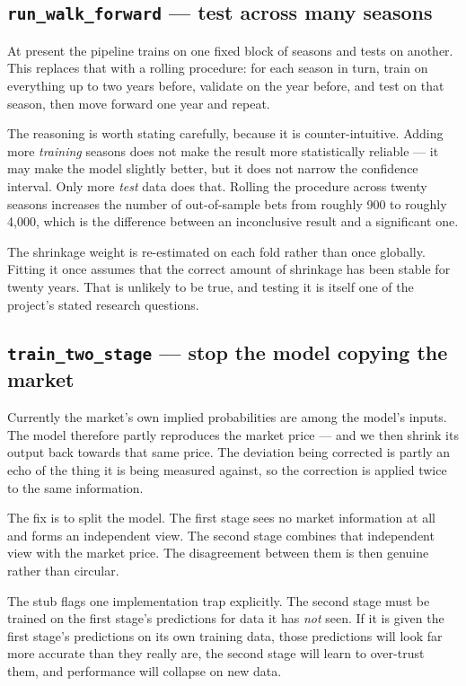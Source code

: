 \documentclass[11pt,a4paper]{article}
\newcommand{\code}[1]{\texttt{#1}}
\begin{document}
\subsection{\code{run\_walk\_forward} --- test across many seasons}

At present the pipeline trains on one fixed block of seasons and tests on
another. This replaces that with a rolling procedure: for each season in turn,
train on everything up to two years before, validate on the year before, and
test on that season, then move forward one year and repeat.

The reasoning is worth stating carefully, because it is counter-intuitive.
Adding more \emph{training} seasons does not make the result more
statistically reliable --- it may make the model slightly better, but it does
not narrow the confidence interval. Only more \emph{test} data does that.
Rolling the procedure across twenty seasons increases the number of
out-of-sample bets from roughly 900 to roughly 4{,}000, which is the
difference between an inconclusive result and a significant one.

The shrinkage weight is re-estimated on each fold rather than once globally.
Fitting it once assumes that the correct amount of shrinkage has been stable
for twenty years. That is unlikely to be true, and testing it is itself one of
the project's stated research questions.

\subsection{\code{train\_two\_stage} --- stop the model copying the market}

Currently the market's own implied probabilities are among the model's inputs.
The model therefore partly reproduces the market price --- and we then shrink
its output back towards that same price. The deviation being corrected is
partly an echo of the thing it is being measured against, so the correction
is applied twice to the same information.

The fix is to split the model. The first stage sees no market information at
all and forms an independent view. The second stage combines that independent
view with the market price. The disagreement between them is then genuine
rather than circular.

The stub flags one implementation trap explicitly. The second stage must be
trained on the first stage's predictions for data it has \emph{not} seen. If
it is given the first stage's predictions on its own training data, those
predictions will look far more accurate than they really are, the second
stage will learn to over-trust them, and performance will collapse on new
data.
\end{document}
